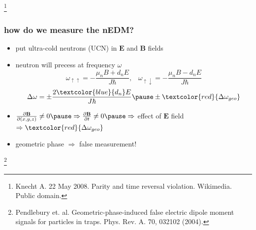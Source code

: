 \documentclass[handout]{beamer}
\renewcommand{\vec}{\mathbf}
\newcommand{\bottomcite}{\let\thefootnote\relax\footnote}
\begin{document}
\begin{frame}
\begin{columns}
    \end{columns}
    
    \bottomcite{Knecht A. 22 May 2008. Parity and time reversal violation. Wikimedia. Public domain.}

\end{frame}

\begin{frame}
\frametitle{how do we measure the nEDM?}

    \begin{itemize}
        \item put ultra-cold neutrons (UCN) in $\vec{E}$ and $\vec{B}$ fields \pause
        \item neutron will precess at frequency $\omega$
        \begin{equation}
        \omega_{\uparrow\uparrow} = -\frac{\mu_n B + d_n E}{J\hbar}, \;\;\;
        \omega_{\uparrow\downarrow} = -\frac{\mu_n B - d_n E}{J\hbar}
        \end{equation} \pause
        \begin{equation}
        \Delta\omega = \pm\frac{2 \textcolor{blue}{d_n} E}{J\hbar} \pause \pm 
        \textcolor{red}{\Delta\omega_{geo}}
        \end{equation} \pause
        \item $\frac{\partial \vec{B}}{\partial (x,y,z)} \neq 0 \pause \Rightarrow
        \frac{\partial \vec{B}}{\partial t} \neq 0 \pause \Rightarrow$ effect of $\vec{E}$ field
        \pause
        $\Rightarrow \textcolor{red}{\Delta\omega_{geo}}$ \pause
        \bigskip
        \item geometric phase $\Rightarrow$ false measurement! 
    \end{itemize}

    \bottomcite{Pendlebury et. al. Geometric-phase-induced false electric dipole moment signals
    for particles in traps. Phys. Rev. A. 70, 032102 (2004).}

\end{frame}
\end{document}
